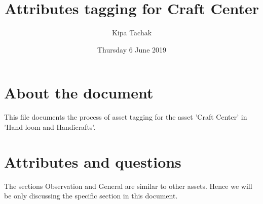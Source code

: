 \documentclass[oneside,twocolumn]{article}
\title{Attributes tagging for Craft Center}
\author{Kipa Tachak}
\date{Thursday  6 June 2019}
\begin{document}
\maketitle

\section{About the document}
This file documents the process of asset tagging for the asset 'Craft Center' in 'Hand loom and Handicrafts'.

\section{Attributes and questions}
The sections Observation and General are similar to other assets. Hence we will be only discussing the specific section in this document.
\end{document}
